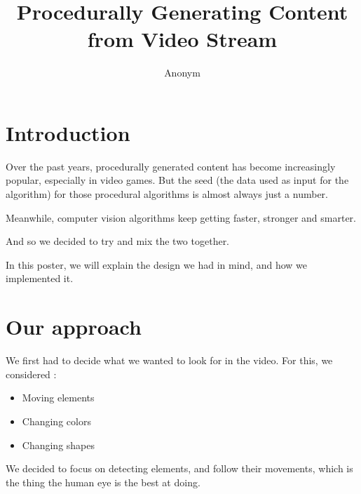\documentclass[conference]{acmsiggraph}
\title{Procedurally Generating Content from Video Stream}
\author{Anonym}
\begin{document}


\maketitle


\copyrightspace

\section{Introduction}

Over the past years, procedurally generated content has become increasingly popular, especially in video games.
But the seed (the data used as input for the algorithm) for those procedural algorithms is almost always  just a number.

Meanwhile, computer vision algorithms keep getting faster, stronger and smarter.

And so we decided to try and mix the two together.

In this poster, we will explain the design we had in mind, and how we implemented it.

\section{Our approach}

We first had to decide what we wanted to look for in the video.
For this, we considered : 
\begin{itemize}
	\item Moving elements
	\item Changing colors
	\item Changing shapes
\end{itemize}

We decided to focus on detecting elements, and follow their movements, which is the thing the human eye is the best at doing.
\end{document}
